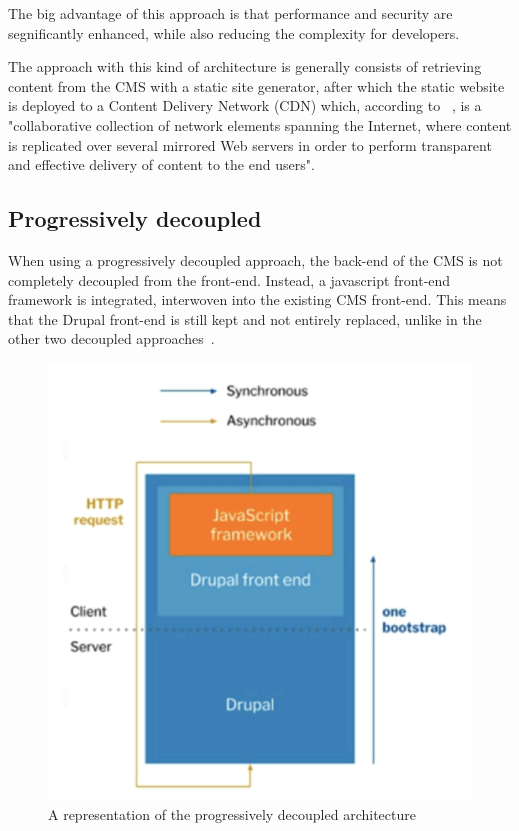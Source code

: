 The big advantage of this approach is that performance and security are segnificantly enhanced, while also reducing the complexity for developers.

The approach with this kind of architecture is generally consists of retrieving content from the CMS with a static site generator, after which the static website is deployed to a Content Delivery Network (CDN) which, according to ~\textcite{Buyya2008}, is a "collaborative collection of network elements spanning the Internet, where content is replicated over
several mirrored Web servers in order to perform transparent and effective delivery of content to the end users".


\subsection{Progressively decoupled}

When using a progressively decoupled approach, the back-end of the CMS is not completely decoupled from the front-end. Instead, a javascript front-end framework is integrated, interwoven into the existing CMS front-end. This means that the Drupal front-end is still kept and not entirely replaced, unlike in the other two decoupled approaches~\autocite{So2018}. 

\begin{figure}
	\centering
	\includegraphics{./img/Progressively_Decoupled.png}
	\caption[Progressively decoupled CMS architecture]{A representation of the progressively decoupled architecture ~\autocite{So2018}}
\end{figure}

